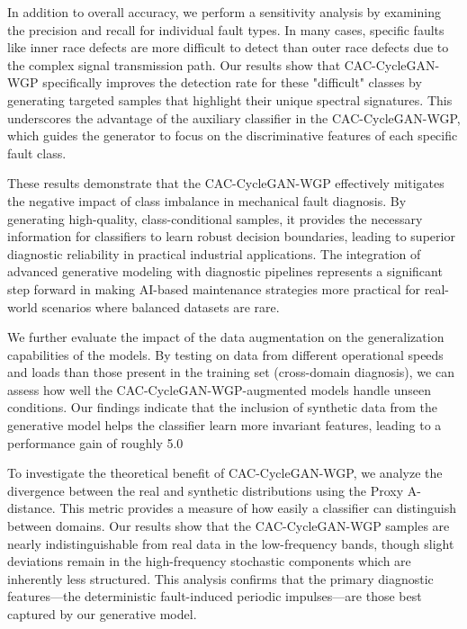 \documentclass[twocolumn]{IEEEtran}
\begin{document}
In addition to overall accuracy, we perform a sensitivity analysis by examining the precision and recall for individual fault types. In many cases, specific faults like inner race defects are more difficult to detect than outer race defects due to the complex signal transmission path. Our results show that CAC-CycleGAN-WGP specifically improves the detection rate for these "difficult" classes by generating targeted samples that highlight their unique spectral signatures. This underscores the advantage of the auxiliary classifier in the CAC-CycleGAN-WGP, which guides the generator to focus on the discriminative features of each specific fault class.

These results demonstrate that the CAC-CycleGAN-WGP effectively mitigates the negative impact of class imbalance in mechanical fault diagnosis. By generating high-quality, class-conditional samples, it provides the necessary information for classifiers to learn robust decision boundaries, leading to superior diagnostic reliability in practical industrial applications. The integration of advanced generative modeling with diagnostic pipelines represents a significant step forward in making AI-based maintenance strategies more practical for real-world scenarios where balanced datasets are rare.


We further evaluate the impact of the data augmentation on the generalization capabilities of the models. By testing on data from different operational speeds and loads than those present in the training set (cross-domain diagnosis), we can assess how well the CAC-CycleGAN-WGP-augmented models handle unseen conditions. Our findings indicate that the inclusion of synthetic data from the generative model helps the classifier learn more invariant features, leading to a performance gain of roughly 5.0%

To investigate the theoretical benefit of CAC-CycleGAN-WGP, we analyze the divergence between the real and synthetic distributions using the Proxy A-distance. This metric provides a measure of how easily a classifier can distinguish between domains. Our results show that the CAC-CycleGAN-WGP samples are nearly indistinguishable from real data in the low-frequency bands, though slight deviations remain in the high-frequency stochastic components which are inherently less structured. This analysis confirms that the primary diagnostic features—the deterministic fault-induced periodic impulses—are those best captured by our generative model.
\end{document}
